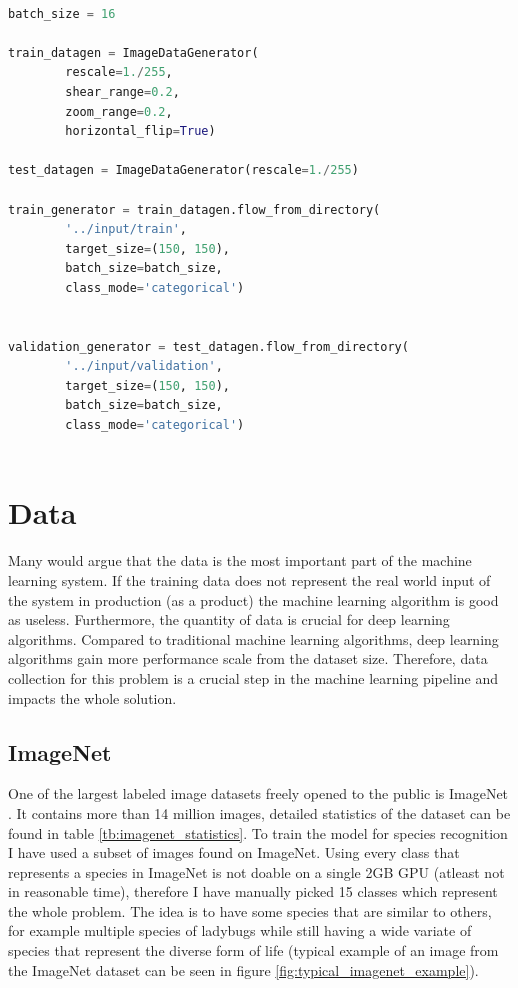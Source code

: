 \documentclass[times, utf8, diplomski]{fer}
\begin{document}
\begin{lstlisting}[language=Python, caption=Data augmentation of the input dataset (images)]

batch_size = 16

train_datagen = ImageDataGenerator(
        rescale=1./255,
        shear_range=0.2,
        zoom_range=0.2,
        horizontal_flip=True)

test_datagen = ImageDataGenerator(rescale=1./255)

train_generator = train_datagen.flow_from_directory(
        '../input/train',
        target_size=(150, 150),
        batch_size=batch_size,
        class_mode='categorical') 


validation_generator = test_datagen.flow_from_directory(
        '../input/validation',
        target_size=(150, 150),
        batch_size=batch_size,
        class_mode='categorical')
        
\end{lstlisting}

\chapter{Data}

Many would argue that the data is the most important part of the machine learning system. If the training data does not represent the real world input of the system in production (as a product) the machine learning algorithm is good as useless. Furthermore, the quantity of data is crucial for deep learning algorithms. Compared to traditional machine learning algorithms, deep learning algorithms gain more performance scale from the dataset size. Therefore, data collection for this problem is a crucial step in the machine learning pipeline and impacts the whole solution.

\section{ImageNet}
\label{se:imagenet}

One of the largest labeled image datasets freely opened to the public is ImageNet \citep{imagenet}. It contains more than 14 million images, detailed statistics of the dataset can be found in table \ref{tb:imagenet_statistics}. To train the model for species recognition I have used a subset of images found on ImageNet. Using every class that represents a species in ImageNet is not doable on a single 2GB GPU (atleast not in reasonable time), therefore I have manually picked 15 classes which represent the whole problem. The idea is to have some species that are similar to others, for example multiple species of ladybugs while still having a wide variate of species that represent the diverse form of life (typical example of an image from the ImageNet dataset can be seen in figure \ref{fig:typical_imagenet_example}).
\end{document}
